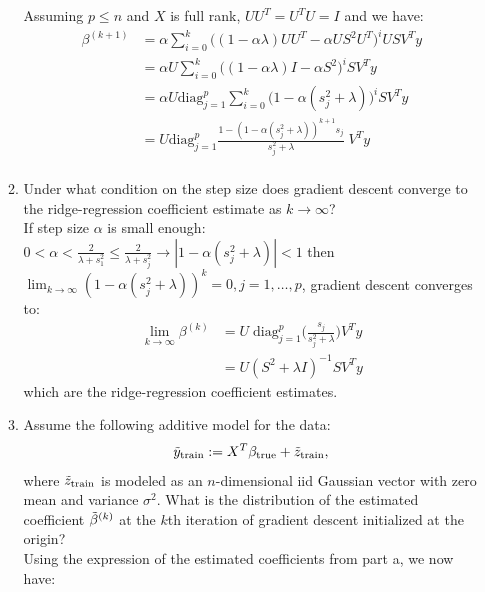 \documentclass[12pt,twoside]{article}
\begin{document}
\begin{enumerate}
\begin{enumerate}
Assuming $p \le n$ and $X$ is full rank, $UU^T = U^T U = I$ and we have:
\begin{align*}
	\beta^{(k+1)}	&=  \alpha  \sum_{i=0}^k \big( (1  - \alpha \lambda) UU^T- \alpha U S^2 U^T \big)^i U S V^T y \\
				&= \alpha U   \sum_{i=0}^k \big( ( 1 - \alpha \lambda) I - \alpha S^2  \big)^i  S V^T y \\
				&=  \alpha U   \text{diag}_{j=1}^p \sum_{i=0}^k \big(  1 - \alpha (s_j^2 + \lambda)  \big)^i  S V^T y \\
				&=  U   \text{diag}_{j=1}^p \frac{ 1 - ( 1 - \alpha (s_j^2 + \lambda))^{k+1} s_j}{s_j^2 + \lambda}  \;  V^T y \\ 
\end{align*}

\item Under what condition on the step size does gradient descent converge to the ridge-regression coefficient estimate as $k \rightarrow \infty$?\\
If step size $\alpha$ is small enough: $0 < \alpha < \frac{2} {\lambda + s_1^2} \le \frac{2} {\lambda + s_j^2} \rightarrow |1 - \alpha (s_j^2 + \lambda)| < 1$ then
 $\lim_{k \rightarrow \infty} (1 - \alpha (s_j^2 + \lambda))^k =0, j=1, \dots ,p $, gradient descent converges to:
\begin{align*}
	\lim_{k \rightarrow \infty} \beta^{(k)}	&= U  \;  \text{diag}_{j=1}^p \bigg( \frac{s_j} {s_j^2 + \lambda} \bigg)  V^T y \\
									&= U (S^2 + \lambda I)^{-1} S V^T y
\end{align*}
which are the ridge-regression coefficient estimates.

\item Assume the following additive model for the data:  
\begin{align}
\tilde{  y }_{\operatorname{train}} := X^T \beta_{\operatorname{true}} + \tilde{ z }_{\operatorname{train}},
\end{align}
where $\tilde{ z }_{\operatorname{train}}$ is modeled as an $n$-dimensional iid Gaussian vector with zero mean and variance $\sigma^2$. What is the distribution of the estimated coefficient $\tilde{ \beta }^{\left( k \right)}$ at the $k$th iteration of gradient descent initialized at the origin?\\
Using the expression of the estimated coefficients from part a, we now have:


\end{enumerate}
\end{enumerate}
\end{document}
